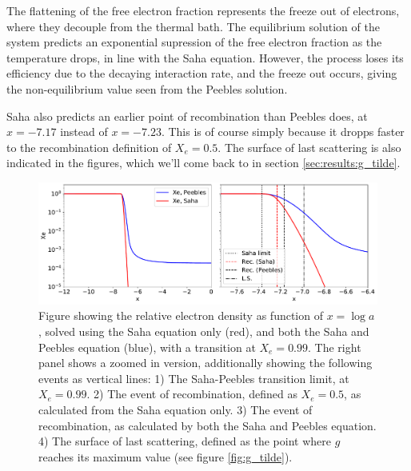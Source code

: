 \documentclass[10pt, a4paper]{article}
\begin{document}
The flattening of the free electron fraction represents the freeze out of electrons, where they decouple from the thermal bath. The equilibrium solution of the system predicts an exponential supression of the free electron fraction as the temperature drops, in line with the Saha equation. However, the process loses its efficiency due to the decaying interaction rate, and the freeze out occurs, giving the non-equilibrium value seen from the Peebles solution.

Saha also predicts an earlier point of recombination than Peebles does, at $x = -7.17$ instead of $x = - 7.23$. This is of course simply because it dropps faster to the recombination definition of $X_e = 0.5$. The surface of last scattering is also indicated in the figures, which we'll come back to in section \ref{sec:results:g_tilde}.



\begin{figure}[H]
    \centering
    \includegraphics[scale=0.5]{../m2_figs/Xe.pdf}
    \caption{Figure showing the relative electron density as function of $x=\log{a}$, solved using the Saha equation only (red), and both the Saha and Peebles equation (blue), with a transition at $X_e = 0.99$. The right panel shows a zoomed in version, additionally showing the following events as vertical lines: 1) The Saha-Peebles transition limit, at $X_e = 0.99$. 2) The event of recombination, defined as $X_e = 0.5$, as calculated from the Saha equation only. 3) The event of recombination, as calculated by both the Saha and Peebles equation. 4) The surface of last scattering, defined as the point where $g$ reaches its maximum value (see figure \ref{fig:g_tilde}).}
    \label{fig:Xe}
\end{figure}
\end{document}
